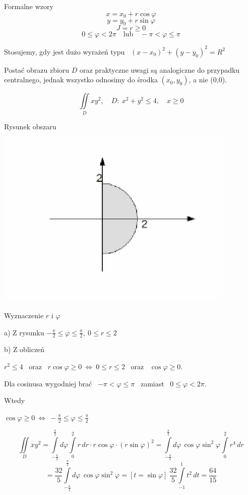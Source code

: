 \begin{tw}{Formalne wzory}
\[ x = x_0 + r \cos \varphi \]
\[ y = y_0 + r \sin \varphi \]
\[ J = r \geq 0 \]
\[ 0 \leq \varphi < 2 \pi \quad \textrm{lub} \quad -\pi < \varphi \leq \pi \]
\end{tw}

Stosujemy, gdy jest dużo wyrażeń typu \ $ (x - x_0)^2 + (y - y_0)^2 = R^2 $

Postać obrazu zbioru $D$ oraz praktyczne uwagi są analogiczne do przypadku centralnego, jednak wszystko odnosimy do środka $(x_0, y_0)$, a nie (0,0).

\begin{przykladbig}
    \[ \iint\limits_D xy^2, \quad D: \ x^2 + y^2 \leq 4, \quad x \geq 0 \]

    Rysunek obszaru
    
    \includegraphics[scale=0.4]{img/polokrag.png}

    Wyznaczenie $r$ i $\varphi$

    a) Z rysunku $ -\frac{\pi}{2} \leq \varphi \leq \frac{\pi}{2}, \ 0 \leq r \leq 2$

    b) Z obliczeń

    $ r^2 \leq 4 $ \ oraz \ $ r \cos \varphi \geq 0 \ \Leftrightarrow \ 0 \leq r \leq 2 $ \ oraz \ $ \cos \varphi \geq 0 $.

    Dla cosinusa wygodniej brać \ $ -\pi < \varphi \leq \pi $ \ zamiast \ $ 0 \leq \varphi < 2\pi $.

    Wtedy

    $ \cos \varphi \geq 0 \ \Leftrightarrow \ -\frac{\pi}{2} \leq \varphi \leq \frac{\pi}{2} $

    \[ \iint\limits_D xy^2 = \int\limits_{-\frac{\pi}{2}}^{\frac{\pi}{2}} d\varphi \int\limits_{0}^{2} r \, dr \cdot r \cos \varphi \cdot (r \sin \varphi)^2 
    = \int\limits_{-\frac{\pi}{2}}^{\frac{\pi}{2}} d \varphi \, \cos \varphi \sin^2 \varphi \int\limits_{0}^{2} r^4 \, dr \]
    \[ = \frac{32}{5} \int\limits_{-\frac{\pi}{2}}^{\frac{\pi}{2}} d \varphi \, \cos \varphi \sin^2 \varphi = [t = \sin \varphi] \ \frac{32}{5} \int\limits_{-1}^{1} t^2 \, dt = \frac{64}{15} \]
\end{przykladbig}

